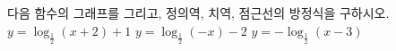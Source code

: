 다음 함수의 그래프를 그리고, 정의역, 치역, 점근선의 방정식을 구하시오.
 $y=\log_{\frac{1}{2}} (x+2)+1$
 $y=\log_{\frac{1}{2}} (-x)-2$
 $y=-\log_{\frac{1}{2}} (x-3)$
